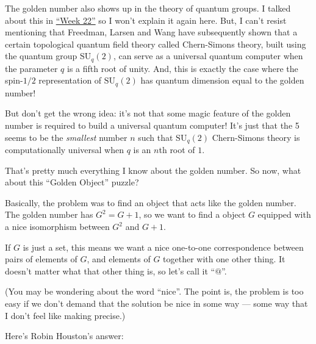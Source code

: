 \documentclass{article}
\def\tightlist{}
\renewcommand{\texttt}[1]{%
  \begingroup
  \ttfamily
  \begingroup\lccode`~=`/\lowercase{\endgroup\def~}{/\discretionary{}{}{}}%
  \begingroup\lccode`~=`[\lowercase{\endgroup\def~}{[\discretionary{}{}{}}%
  \begingroup\lccode`~=`.\lowercase{\endgroup\def~}{.\discretionary{}{}{}}%
  \catcode`/=\active\catcode`[=\active\catcode`.=\active
  \scantokens{#1\noexpand}%
  \endgroup
}
\begin{document}
The golden number also shows up in the theory of quantum groups. I
talked about this in \protect\hyperlink{week22}{``Week 22''} so I won't
explain it again here. But, I can't resist mentioning that Freedman,
Larsen and Wang have subsequently shown that a certain topological
quantum field theory called Chern-Simons theory, built using the quantum
group \(\mathrm{SU}_q(2)\), can serve as a universal quantum computer
when the parameter \(q\) is a fifth root of unity. And, this is exactly
the case where the spin-\(1/2\) representation of \(\mathrm{SU}_q(2)\)
has quantum dimension equal to the golden number!


But don't get the wrong idea: it's not that some magic feature of the
golden number is required to build a universal quantum computer! It's
just that the 5 seems to be the \emph{smallest} number \(n\) such that
\(\mathrm{SU}_q(2)\) Chern-Simons theory is computationally universal
when \(q\) is an \(n\)th root of \(1\).

That's pretty much everything I know about the golden number. So now,
what about this ``Golden Object'' puzzle?

Basically, the problem was to find an object that acts like the golden
number. The golden number has \(G^2 = G + 1\), so we want to find a
object \(G\) equipped with a nice isomorphism between \(G^2\) and
\(G + 1\).

If \(G\) is just a set, this means we want a nice one-to-one
correspondence between pairs of elements of \(G\), and elements of \(G\)
together with one other thing. It doesn't matter what that other thing
is, so let's call it ``\(@\)''.

(You may be wondering about the word ``nice''. The point is, the problem
is too easy if we don't demand that the solution be nice in some way ---
some way that I don't feel like making precise.)

Here's Robin Houston's answer:
\end{document}
